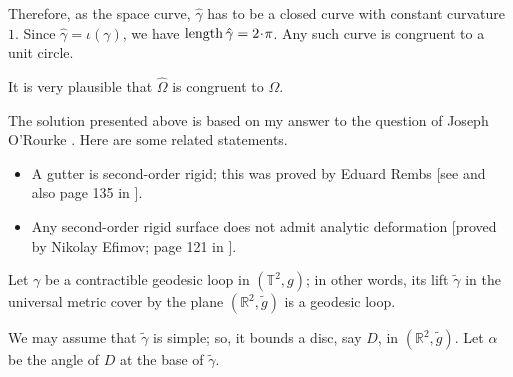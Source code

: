 Therefore, as the space curve,
$\hat\gamma$ has to be a closed curve with constant curvature $1$.
Since $\hat\gamma=\iota(\gamma)$, we have $\length\hat\gamma=2\cdot\pi$.
Any such curve is congruent to a unit circle.
\qeds

It is very plausible that $\hat\Omega$ is congruent to $\Omega$.


The solution presented above is based on my answer 
to the question of Joseph O'Rourke \cite{rourke}.
Here are some related statements.
\begin{itemize}
\item A gutter is second-order rigid;
this was proved by Eduard Rembs
[see  and also page 135 in ].
\item Any second-order rigid surface does not admit analytic deformation 
[proved by Nikolay Efimov; page 121 in ].
\end{itemize}









Let $\gamma$ be a contractible geodesic loop in $(\mathbb{T}^2,g)$;
in other words, its lift $\tilde\gamma$ in the universal metric cover by the plane $(\mathbb{R}^2,\tilde g)$ is a geodesic loop.

We may assume that $\tilde \gamma$ is simple; so, it bounds a disc, say $D$, in $(\mathbb{R}^2,\tilde g)$.
Let $\alpha$ be the angle of $D$ at the base of $\tilde \gamma$.

